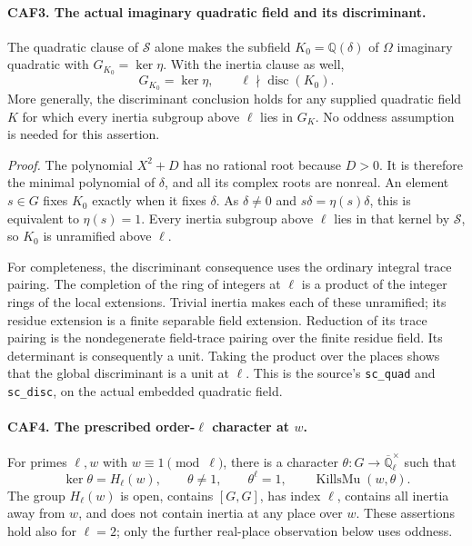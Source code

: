 \documentclass[11pt,a4paper]{article}
\numberwithin{equation}{section}
\theoremstyle{remark}\newtheorem{remark}[theorem]{Remark}
\begin{document}
\paragraph{CAF3. The actual imaginary quadratic field and its discriminant.}
\label{claim:CAF3}
The quadratic clause of \(\mathcal S\) alone makes the subfield
\(K_0=\mathbb Q(\delta)\) of \(\Omega\) imaginary quadratic with
\(G_{K_0}=\ker\eta\).  With the inertia clause as well,
\[
                 G_{K_0}=\ker\eta,\qquad
                 \ell\nmid\operatorname{disc}(K_0).
 \tag{CAF.6}
\]
More generally, the discriminant conclusion holds for any supplied
quadratic field \(K\) for which every inertia subgroup above
\(\ell\) lies in \(G_K\).  No oddness assumption is needed for
this assertion.

\emph{Proof.}
The polynomial \(X^2+D\) has no rational root because \(D>0\).
It is therefore the minimal polynomial of \(\delta\), and all its
complex roots are nonreal.  An element \(s\in G\) fixes \(K_0\)
exactly when it fixes \(\delta\).  As \(\delta\ne0\) and
\(s\delta=\eta(s)\delta\), this is equivalent to \(\eta(s)=1\).
Every inertia subgroup above \(\ell\) lies in that kernel by
\(\mathcal S\), so \(K_0\) is unramified above \(\ell\).

For completeness, the discriminant consequence uses the ordinary
integral trace pairing.  The completion of the ring of integers at
\(\ell\) is a product of the integer rings of the local extensions.
Trivial inertia makes each of these unramified; its residue extension
is a finite separable field extension.  Reduction of its trace pairing
is the nondegenerate field-trace pairing over the finite residue field.
Its determinant is consequently a unit.  Taking the product over the
places shows that the global discriminant is a unit at \(\ell\).
This is the source's \texttt{sc\_\allowbreak quad} and \texttt{sc\_\allowbreak disc}, on the
actual embedded quadratic field.

\paragraph{CAF4. The prescribed order-\(\ell\) character at \(w\).}
\label{claim:CAF4}
For primes \(\ell,w\) with \(w\equiv1\pmod\ell\), there is a
character \(\theta:G\to\overline{\mathbb Q}_\ell^\times\) such that
\[
 \ker\theta=H_\ell(w),\qquad \theta\ne1,
 \qquad\theta^\ell=1,
 \qquad\operatorname{KillsMu}(w,\theta).
 \tag{CAF.7}
\]
The group \(H_\ell(w)\) is open, contains \([G,G]\), has index
\(\ell\), contains all inertia away from \(w\), and does not
contain inertia at any place over \(w\).  These assertions hold also
for \(\ell=2\); only the further real-place observation below uses
oddness.
\end{document}
